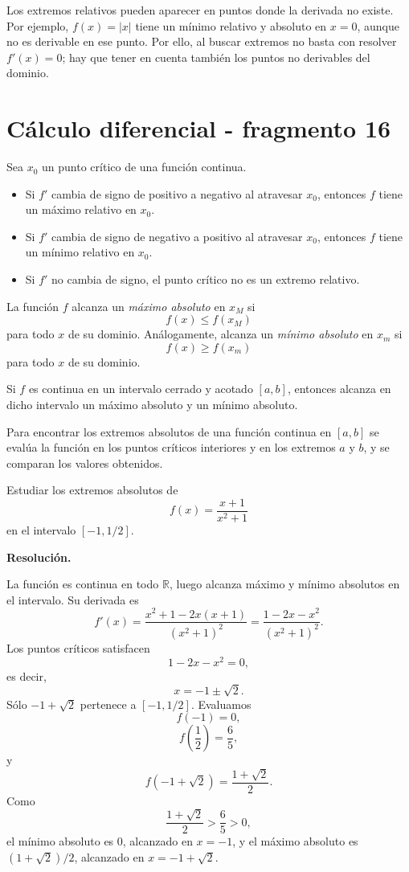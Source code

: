 Los extremos relativos pueden aparecer en puntos donde la derivada no existe. Por ejemplo, $f(x)=|x|$ tiene un mínimo relativo y absoluto en $x=0$, aunque no es derivable en ese punto. Por ello, al buscar extremos no basta con resolver $f'(x)=0$; hay que tener en cuenta también los puntos no derivables del dominio.


\section{Cálculo diferencial - fragmento 16}
\begin{theorem}
Sea $x_0$ un punto crítico de una función continua.
\begin{itemize}
\item Si $f'$ cambia de signo de positivo a negativo al atravesar $x_0$, entonces $f$ tiene un máximo relativo en $x_0$.
\item Si $f'$ cambia de signo de negativo a positivo al atravesar $x_0$, entonces $f$ tiene un mínimo relativo en $x_0$.
\item Si $f'$ no cambia de signo, el punto crítico no es un extremo relativo.
\end{itemize}
\end{theorem}

\begin{definition}
La función $f$ alcanza un \emph{máximo absoluto} en $x_M$ si
\[
f(x)\leq f(x_M)
\]
para todo $x$ de su dominio. Análogamente, alcanza un \emph{mínimo absoluto} en $x_m$ si
\[
f(x)\geq f(x_m)
\]
para todo $x$ de su dominio.
\end{definition}

\begin{theorem}
Si $f$ es continua en un intervalo cerrado y acotado $[a,b]$, entonces alcanza en dicho intervalo un máximo absoluto y un mínimo absoluto.
\end{theorem}

Para encontrar los extremos absolutos de una función continua en $[a,b]$ se evalúa la función en los puntos críticos interiores y en los extremos $a$ y $b$, y se comparan los valores obtenidos.

\begin{solvedexercise}
Estudiar los extremos absolutos de
\[
f(x)=\frac{x+1}{x^2+1}
\]
en el intervalo $[-1,1/2]$.

\textbf{Resolución.}\par\smallskip
La función es continua en todo $\mathbb{R}$, luego alcanza máximo y mínimo absolutos en el intervalo. Su derivada es
\[
f'(x)=\frac{x^2+1-2x(x+1)}{(x^2+1)^2}
=
\frac{1-2x-x^2}{(x^2+1)^2}.
\]
Los puntos críticos satisfacen
\[
1-2x-x^2=0,
\]
es decir,
\[
x=-1\pm\sqrt2.
\]
Sólo $-1+\sqrt2$ pertenece a $[-1,1/2]$. Evaluamos
\[
f(-1)=0,
\]
\[
f\left(\frac12\right)=\frac{6}{5},
\]
y
\[
f(-1+\sqrt2)=\frac{1+\sqrt2}{2}.
\]
Como
\[
\frac{1+\sqrt2}{2}>\frac65>0,
\]
el mínimo absoluto es $0$, alcanzado en $x=-1$, y el máximo absoluto es $(1+\sqrt2)/2$, alcanzado en $x=-1+\sqrt2$.
\end{solvedexercise}


